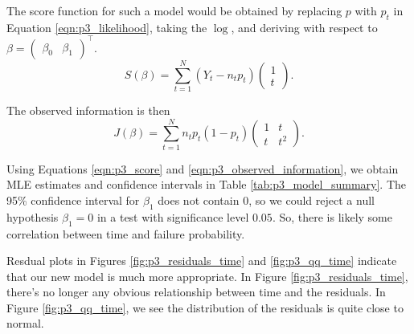 \documentclass[letterpaper,11pt]{article}
\begin{document}
\begin{enumerate}
\begin{enumerate}
\begin{description}
        The score function for such a model would be obtained by replacing $p$
        with $p_t$ in Equation \ref{eqn:p3_likelihood}, taking the $\log$, and
        deriving with respect to $\beta = \begin{pmatrix} \beta_0 & \beta_1
        \end{pmatrix}^\intercal$.
        \begin{equation}
          S\left(\beta\right)
          = \sum_{t = 1}^N \left(
            Y_t - n_tp_t
          \right)
          \begin{pmatrix}
            1 \\
            t
          \end{pmatrix}.
          \label{eqn:p3_score}          
        \end{equation}

        The observed information is then
        \begin{equation}
          J\left(\beta\right)
          = \sum_{t=1}^N n_tp_t\left(1 - p_t\right)
          \begin{pmatrix}
            1 & t \\
            t & t^2
          \end{pmatrix}.
          \label{eqn:p3_observed_information}
        \end{equation}

        Using Equations \ref{eqn:p3_score} and
        \ref{eqn:p3_observed_information}, we obtain MLE estimates and
        confidence intervals in Table \ref{tab:p3_model_summary}. The 95\%
        confidence interval for $\beta_1$ does not contain $0$, so we could
        reject a null hypothesis $\beta_1 = 0$ in a test with significance level
        $0.05$. So, there is likely some correlation between time and failure
        probability.

        Resdual plots in Figures \ref{fig:p3_residuals_time} and
        \ref{fig:p3_qq_time} indicate that our new model is much more
        appropriate. In Figure \ref{fig:p3_residuals_time}, there's no longer
        any obvious relationship between time and the residuals. In Figure
        \ref{fig:p3_qq_time}, we see the distribution of the residuals is quite
        close to normal.
      \end{description}


\end{enumerate}
\end{enumerate}
\end{document}
